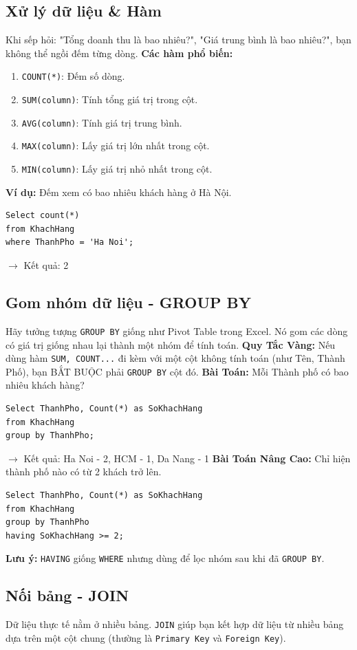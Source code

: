 \documentclass[12pt,a4paper]{article}
\begin{document}
\subsection{Xử lý dữ liệu \& Hàm}
Khi sếp hỏi: "Tổng doanh thu là bao nhiêu?", "Giá trung bình là bao nhiêu?", bạn không thể ngồi đếm từng dòng.
\textbf{Các hàm phổ biến: }
\begin{enumerate}
    \item \texttt{COUNT(*)}: Đếm số dòng.
    \item \texttt{SUM(column)}: Tính tổng giá trị trong cột.
    \item \texttt{AVG(column)}: Tính giá trị trung bình.
    \item \texttt{MAX(column)}: Lấy giá trị lớn nhất trong cột.
    \item \texttt{MIN(column)}: Lấy giá trị nhỏ nhất trong cột.
\end{enumerate}
\textbf{Ví dụ: } Đếm xem có bao nhiêu khách hàng ở Hà Nội.
\begin{lstlisting}[style=sqlstyle]
Select count(*) 
from KhachHang
where ThanhPho = 'Ha Noi';
\end{lstlisting}
$\rightarrow$ Kết quả: 2
\subsection{Gom nhóm dữ liệu - GROUP BY}
Hãy tưởng tượng \texttt{GROUP BY} giống như Pivot Table trong Excel. Nó gom các dòng có giá trị giống nhau lại thành một nhóm để tính toán.\newline
\textbf{Quy Tắc Vàng: }Nếu dùng hàm \texttt{SUM, COUNT...} đi kèm với một cột không tính toán (như Tên, Thành Phố), bạn BẮT BUỘC phải \texttt{GROUP BY} cột đó.
\textbf{Bài Toán: } Mỗi Thành phố có bao nhiêu khách hàng?
\begin{lstlisting}[style=sqlstyle]
Select ThanhPho, Count(*) as SoKhachHang
from KhachHang
group by ThanhPho;
\end{lstlisting}
$\rightarrow$ Kết quả: Ha Noi - 2, HCM - 1, Da Nang - 1
\textbf{Bài Toán Nâng Cao: } Chỉ hiện thành phố nào có từ 2 khách trở lên.
\begin{lstlisting}[style=sqlstyle]
Select ThanhPho, Count(*) as SoKhachHang
from KhachHang
group by ThanhPho
having SoKhachHang >= 2;
\end{lstlisting}
\textbf{Lưu ý: } \texttt{HAVING} giống \texttt{WHERE} nhưng dùng để lọc nhóm sau khi đã \texttt{GROUP BY}.
\subsection{Nối bảng - JOIN}
Dữ liệu thực tế nằm ở nhiều bảng. \texttt{JOIN} giúp bạn kết hợp dữ liệu từ nhiều bảng dựa trên một cột chung (thường là \texttt{Primary Key} và \texttt{Foreign Key}).
\end{document}
